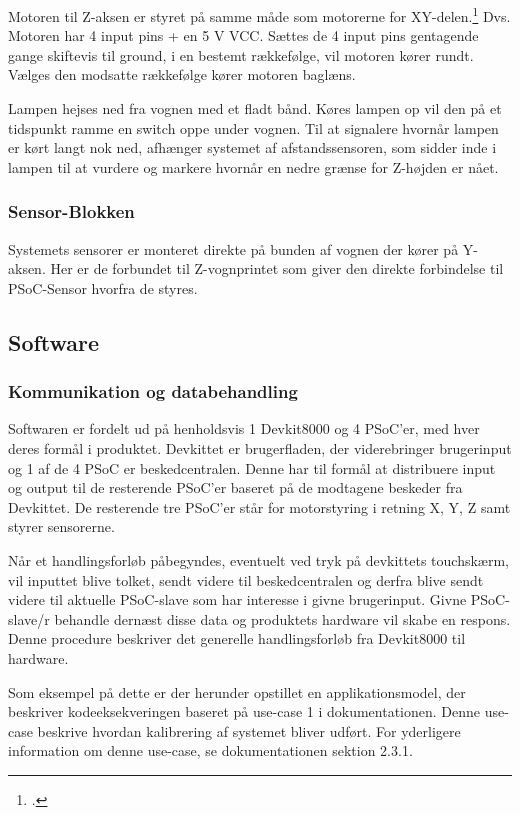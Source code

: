 Motoren til Z-aksen er styret på samme måde som motorerne for XY-delen.\footcite{documentation} Dvs. Motoren har 4 input pins + en 5 V VCC. Sættes de 4 input pins gentagende gange skiftevis til ground, i en bestemt rækkefølge, vil motoren kører rundt. Vælges den modsatte rækkefølge kører motoren baglæns.

Lampen hejses ned fra vognen med et fladt bånd. Køres lampen op vil den på et tidspunkt ramme en switch oppe under vognen. Til at signalere hvornår lampen er kørt langt nok ned, afhænger systemet af afstandssensoren, som sidder inde i lampen til at vurdere og markere hvornår en nedre grænse for Z-højden er nået.

\subsubsection{Sensor-Blokken}

Systemets sensorer er monteret direkte på bunden af vognen der kører på Y-aksen. Her er de forbundet til Z-vognprintet som giver den direkte forbindelse til PSoC-Sensor hvorfra de styres.

\subsection{Software}

\subsubsection{Kommunikation og databehandling}

Softwaren er fordelt ud på henholdsvis 1 Devkit8000 og 4 PSoC'er, med hver deres formål i produktet. Devkittet er brugerfladen, der viderebringer brugerinput og 1 af de 4 PSoC er beskedcentralen. Denne har til formål at distribuere input og output til de resterende PSoC'er baseret på de modtagene beskeder fra Devkittet. De resterende tre PSoC'er står for motorstyring i retning X, Y, Z samt styrer sensorerne.

Når et handlingsforløb påbegyndes, eventuelt ved tryk på devkittets touchskærm, vil inputtet blive tolket, sendt videre til beskedcentralen og derfra blive sendt videre til aktuelle PSoC-slave som har interesse i givne brugerinput. Givne PSoC-slave/r behandle dernæst disse data og produktets hardware vil skabe en respons. Denne procedure beskriver det generelle handlingsforløb fra Devkit8000 til hardware. 

Som eksempel på dette er der herunder opstillet en applikationsmodel, der beskriver kodeeksekveringen baseret på use-case 1 i dokumentationen. Denne use-case beskrive hvordan kalibrering af systemet bliver udført. For yderligere information om denne use-case, se dokumentationen sektion 2.3.1.


